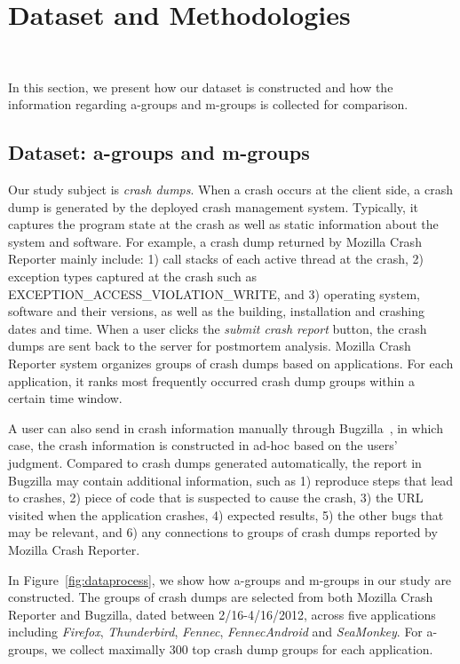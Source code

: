 \section{Dataset and Methodologies}~\label{sec:approach}

In this section, we present how our dataset is constructed and how the information regarding a-groups and m-groups is collected for comparison.

\subsection{Dataset: a-groups and m-groups}
Our study subject is {\it crash dumps}.  When a crash occurs at the client side, a crash dump is generated by the deployed crash management system. Typically, it captures the program state at the crash as well as static information about the system and software. For example, a crash dump returned by Mozilla Crash Reporter mainly include: 1) call stacks of each active thread at the crash, 2) exception types captured at the crash such as EXCEPTION\_ACCESS\_VIOLATION\_WRITE, and 3) operating system, software and their versions, as well as the building, installation and crashing dates and time.  When a user clicks the {\it submit crash report} button, the crash dumps are sent back to the server for postmortem analysis.  Mozilla Crash Reporter system organizes groups of crash dumps based on applications. For each application, it ranks most frequently occurred crash dump groups within a certain time window. 

A user can also send in crash information manually through Bugzilla~\cite{bugzilla}, in which case, the crash information is constructed in ad-hoc based on the users' judgment. Compared to crash dumps generated automatically, the report in Bugzilla may contain additional information, such as 1) reproduce steps that lead to crashes, 2) piece of code that is suspected to cause the crash, 3) the URL visited when the application crashes, 4) expected results, 5) the other bugs that may be relevant, and 6) any connections to groups of crash dumps reported by Mozilla Crash Reporter. 

In Figure~\ref{fig:dataprocess}, we show how a-groups and m-groups in our study are constructed. The groups of crash dumps are selected from both Mozilla Crash Reporter and Bugzilla, dated between 2/16-4/16/2012, across five applications including {\it Firefox}, {\it Thunderbird}, {\it Fennec}, {\it FennecAndroid} and {\it SeaMonkey}. For a-groups, we collect maximally 300 top crash dump groups for each application. 


